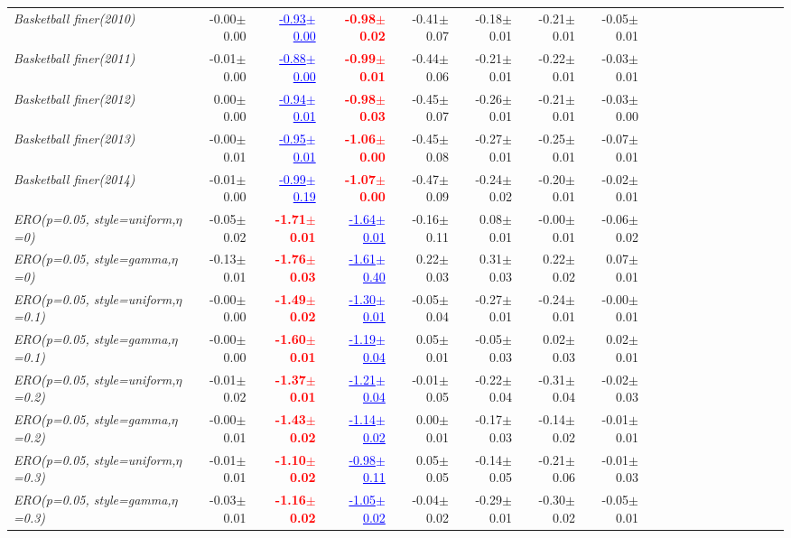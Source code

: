 \documentclass[nohyperref]{article}
\theoremstyle{plain}
\theoremstyle{definition}
\theoremstyle{remark}
\newcommand{\red}[1]{\textcolor{red}{\textbf{#1}}}
\newcommand{\blue}[1]{\textcolor{blue}{\underline{#1}}}
\begin{document}
\begin{table*}[!ht]
{\begin{tabular}{lrrrrrrrrrrrrrrrrrr}
			{\it Basketball finer(2010)} & -0.00$\pm$0.00 & \blue{-0.93$\pm$0.00} & \red{-0.98$\pm$0.02} & -0.41$\pm$0.07 & -0.18$\pm$0.01 & -0.21$\pm$0.01 & -0.05$\pm$0.01 \\
			{\it Basketball finer(2011)} & -0.01$\pm$0.00 & \blue{-0.88$\pm$0.00} & \red{-0.99$\pm$0.01} & -0.44$\pm$0.06 & -0.21$\pm$0.01 & -0.22$\pm$0.01 & -0.03$\pm$0.01 \\
			{\it Basketball finer(2012)} & 0.00$\pm$0.00 & \blue{-0.94$\pm$0.01} & \red{-0.98$\pm$0.03} & -0.45$\pm$0.07 & -0.26$\pm$0.01 & -0.21$\pm$0.01 & -0.03$\pm$0.00 \\
			{\it Basketball finer(2013)} & -0.00$\pm$0.01 & \blue{-0.95$\pm$0.01} & \red{-1.06$\pm$0.00} & -0.45$\pm$0.08 & -0.27$\pm$0.01 & -0.25$\pm$0.01 & -0.07$\pm$0.01 \\
			{\it Basketball finer(2014)} & -0.01$\pm$0.00 & \blue{-0.99$\pm$0.19} & \red{-1.07$\pm$0.00} & -0.47$\pm$0.09 & -0.24$\pm$0.02 & -0.20$\pm$0.01 & -0.02$\pm$0.01 \\
			{\it ERO(p=0.05, style=uniform,$\eta$=0)} & -0.05$\pm$0.02 & \red{-1.71$\pm$0.01} & \blue{-1.64$\pm$0.01} & -0.16$\pm$0.11 & 0.08$\pm$0.01 & -0.00$\pm$0.01 & -0.06$\pm$0.02 \\
			{\it ERO(p=0.05, style=gamma,$\eta$=0)} & -0.13$\pm$0.01 & \red{-1.76$\pm$0.03} & \blue{-1.61$\pm$0.40} & 0.22$\pm$0.03 & 0.31$\pm$0.03 & 0.22$\pm$0.02 & 0.07$\pm$0.01 \\
			{\it ERO(p=0.05, style=uniform,$\eta$=0.1)} & -0.00$\pm$0.00 & \red{-1.49$\pm$0.02} & \blue{-1.30$\pm$0.01} & -0.05$\pm$0.04 & -0.27$\pm$0.01 & -0.24$\pm$0.01 & -0.00$\pm$0.01 \\
			{\it ERO(p=0.05, style=gamma,$\eta$=0.1)} & -0.00$\pm$0.00 & \red{-1.60$\pm$0.01} & \blue{-1.19$\pm$0.04} & 0.05$\pm$0.01 & -0.05$\pm$0.03 & 0.02$\pm$0.03 & 0.02$\pm$0.01 \\
			{\it ERO(p=0.05, style=uniform,$\eta$=0.2)} & -0.01$\pm$0.02 & \red{-1.37$\pm$0.01} & \blue{-1.21$\pm$0.04} & -0.01$\pm$0.05 & -0.22$\pm$0.04 & -0.31$\pm$0.04 & -0.02$\pm$0.03 \\
			{\it ERO(p=0.05, style=gamma,$\eta$=0.2)} & -0.00$\pm$0.01 & \red{-1.43$\pm$0.02} & \blue{-1.14$\pm$0.02} & 0.00$\pm$0.01 & -0.17$\pm$0.03 & -0.14$\pm$0.02 & -0.01$\pm$0.01 \\
			{\it ERO(p=0.05, style=uniform,$\eta$=0.3)} & -0.01$\pm$0.01 & \red{-1.10$\pm$0.02} & \blue{-0.98$\pm$0.11} & 0.05$\pm$0.05 & -0.14$\pm$0.05 & -0.21$\pm$0.06 & -0.01$\pm$0.03 \\
			{\it ERO(p=0.05, style=gamma,$\eta$=0.3)} & -0.03$\pm$0.01 & \red{-1.16$\pm$0.02} & \blue{-1.05$\pm$0.02} & -0.04$\pm$0.02 & -0.29$\pm$0.01 & -0.30$\pm$0.02 & -0.05$\pm$0.01 \\

\end{tabular}}
\end{table*}
\end{document}
